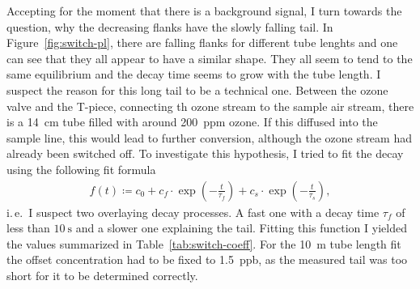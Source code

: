 Accepting for the moment that there is a background  signal, I
turn towards the question, why the decreasing flanks have the slowly
falling tail. In Figure~\ref{fig:switch-pl}, there are falling flanks for
different tube lenghts and one can see that they all appear to have a
similar shape. They all seem to tend to the same equilibrium and the
decay time seems to grow with the tube length. I suspect the reason
for this long tail to be a technical one. Between the ozone valve and
the T-piece, connecting th ozone stream to the sample air stream,
there is a \SI{14}{\centi\meter} tube filled with around
\SI{200}{ppm} ozone. If this diffused into the sample line, this would
lead to further  conversion, although the ozone stream had 
already been switched off. To investigate this hypothesis, I tried to fit
the decay using the following fit formula
\begin{align}
  f(t) \coloneqq c_0 + c_f \cdot\exp\left( -\frac{t}{\tau_f}\right) +
  c_s \cdot \exp\left(-\frac{t}{\tau_s}\right), \label{eq:switch-fit}
\end{align}
i.\,e.\ I suspect two overlaying decay processes. A fast one with a
decay time $\tau_f$ of less than $\SI{10}{\second}$ and a slower one
explaining the tail. Fitting this function I yielded the values
summarized in Table~\ref{tab:switch-coeff}. For the \SI{10}{\meter}
tube length fit the offset concentration had to be fixed to
\SI{1.5}{ppb}, as the measured tail was too short for it to be
determined correctly.

